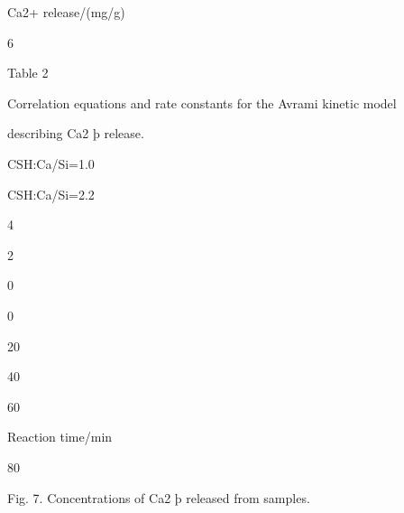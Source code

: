 \documentclass[a4paper,portrait,12pt]{article}
\begin{document}
\begin{flushleft}
Ca2+ release/(mg/g)
\end{flushleft}





6





\begin{flushleft}
Table 2
\end{flushleft}


\begin{flushleft}
Correlation equations and rate constants for the Avrami kinetic model
\end{flushleft}


\begin{flushleft}
describing Ca2 þ release.
\end{flushleft}





\begin{flushleft}
CSH:Ca/Si=1.0
\end{flushleft}


\begin{flushleft}
CSH:Ca/Si=2.2
\end{flushleft}





4





2





0


0





20





40


60


\begin{flushleft}
Reaction time/min
\end{flushleft}





80





\begin{flushleft}
Fig. 7. Concentrations of Ca2 þ released from samples.
\end{flushleft}
\end{document}
